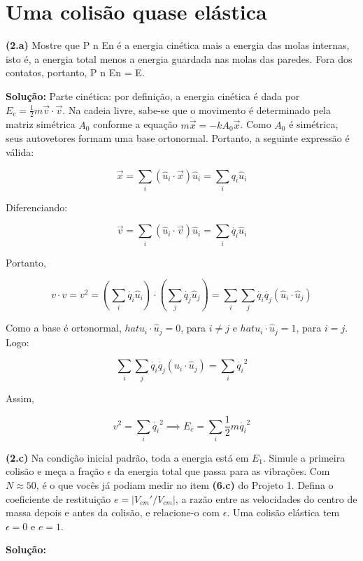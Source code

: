 \section{Uma colisão quase elástica}

\textbf{(2.a)} Mostre que P n En é a energia cinética mais a energia das molas internas, isto é, a energia total menos a energia guardada nas molas das paredes. Fora dos contatos, portanto, P n En = E.

\vspace{0.3cm}

\textbf{Solução:}
Parte cinética: por definição, a energia cinética é dada por $E_c = \frac{1}{2} m \vec{v} \cdot \vec{v}$.
Na cadeia livre, sabe-se que o movimento é determinado pela matriz simétrica $A_0$ conforme a equação $m \ddot{\vec{x}} = -k A_0 \vec{x}$. Como $A_0$ é 
simétrica, seus autovetores formam uma base ortonormal. Portanto, a seguinte expressão é válida:

\[ \vec{x} = \sum_i (\hat{u}_i \cdot \vec{x}) \hat{u}_i = \sum_i q_i \hat{u}_i \]

Diferenciando:

\[ \vec{v} = \sum_i (\hat{u}_i \cdot \vec{v}) \hat{u}_i = \sum_i \dot{q_i} \hat{u}_i \]

Portanto,

\[ v \cdot v = v^2 = (\sum_i \dot{q_i} \hat{u}_i) \cdot (\sum_j \dot{q_j} \hat{u}_j) =  \sum_i \sum_j \dot{q_i} \dot{q_j} (\hat{u}_i \cdot \hat{u}_j)\]

Como a base é ortonormal, $hat{u}_i \cdot \hat{u}_j = 0$, para $i \neq j$ e $hat{u}_i \cdot \hat{u}_j = 1$, para $i = j$. Logo:

\[\sum_i \sum_j \dot{q_i} \dot{q_j} (\hat{u}_i \cdot \hat{u}_j) = \sum_i \dot{q_i}^2\]

Assim,

\[ v^2 = \sum_i \dot{q_i}^2 \implies E_c = \sum_i \frac{1}{2} m \dot{q_i}^2\]


\vspace{0.3cm}
\textbf{(2.c)} Na condição inicial padrão, toda a energia está em $E_1$. Simule a primeira colisão e meça a
fração $\epsilon$ da energia total que passa para as vibrações. Com $N \approx 50$, é o que vocês já podiam
medir no item \textbf{(6.c)} do Projeto 1. Defina o coeficiente de restituição $e = |V_{cm}'/V_{cm}|$, a razão entre
as velocidades do centro de massa depois e antes da colisão, e relacione-o com $\epsilon$. Uma colisão
elástica tem $\epsilon = 0$ e $e = 1$.

\vspace{0.3cm}
\textbf{Solução:}

